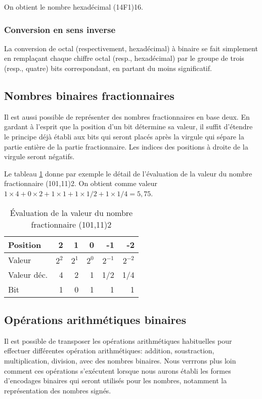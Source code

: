 \documentclass[11pt]{article}
\begin{document}
On obtient le nombre hexadécimal (14F1)16.

\subsubsection{Conversion en sens inverse}
\label{sec:orge2669c4}

La conversion de octal (respectivement, hexadécimal) à binaire se fait
simplement en remplaçant chaque chiffre octal (resp., hexadécimal) par
le groupe de trois (resp., quatre) bits correspondant, en partant du
moins significatif.

\subsection{Nombres binaires fractionnaires}
\label{sec:orgadb06ff}

Il est aussi possible de représenter des nombres fractionnaires en
base deux. En gardant à l'esprit que la position d'un bit détermine sa
valeur, il suffit d'étendre le principe déjà établi aux bits qui
seront placés après la virgule qui sépare la partie entière de la
partie fractionnaire. Les indices des positions à droite de la virgule
seront négatifs.

Le tableau \ref{tab:orgea0e389} donne par exemple le détail de l'évaluation
de la valeur du nombre fractionnaire (101,11)2. On obtient comme
valeur \(1 \times 4 + 0 \times 2 + 1 \times 1 + 1 \times 1/2 + 1
\times 1/4 = 5,75\).

\begin{table}[htbp]
\caption{\label{tab:orgea0e389}Évaluation de la valeur du nombre fractionnaire (101,11)2}
\centering
\begin{tabular}{lrrrrr}
Position & 2 & 1 & 0 & -1 & -2\\
\hline
Valeur & \(2^2\) & \(2^1\) & \(2^0\) & \(2^{-1}\) & \(2^{-2}\)\\
Valeur déc. & 4 & 2 & 1 & 1/2 & 1/4\\
Bit & 1 & 0 & 1 & 1 & 1\\
\end{tabular}
\end{table}

\subsection{Opérations arithmétiques binaires}
\label{sec:org74054be}

Il est possible de transposer les opérations arithmétiques habituelles
pour effectuer différentes opération arithmétiques: addition,
soustraction, multiplication, division, avec des nombres
binaires. Nous verrrons plus loin comment ces opérations s'exécutent
lorsque nous aurons établi les formes d'encodages binaires qui seront
utilisés pour les nombres, notamment la représentation des nombres
signés.
\end{document}
